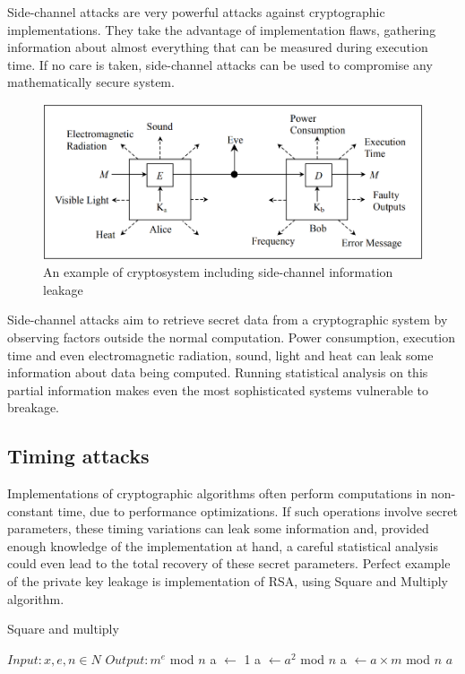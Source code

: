 \documentclass[oneside,openright,12pt,final,en]{mgr}
\begin{document}
Side-channel attacks are very powerful attacks against cryptographic implementations. They take the advantage of implementation flaws, gathering information about almost everything that can be measured during execution time. If no care is taken, side-channel attacks can be used to compromise any mathematically secure system. 
\begin{figure}[H]
	\centering
	\includegraphics{sidechannel}
	\caption{An example of cryptosystem including side-channel information leakage}
	\label{fig:sidechannel}
\end{figure}

Side-channel attacks aim to retrieve secret data from a cryptographic system by observing factors outside the normal computation. Power consumption, execution time and even electromagnetic radiation, sound, light and heat can leak some information about data being computed. Running statistical analysis on this partial information makes even the most sophisticated systems vulnerable to breakage. 


\subsection{Timing attacks}

Implementations of cryptographic algorithms often perform computations in non-constant
time, due to performance optimizations. If such operations involve secret parameters, these timing
variations can leak some information and, provided enough knowledge of the implementation at
hand, a careful statistical analysis could even lead to the total recovery of these secret parameters.\cite{sc} Perfect example of the private key leakage is implementation of RSA, using Square and Multiply algorithm.\cite{sqm}

\begin{algorithm}[H]
	\caption{Square and multiply}\label{sqm}
	\begin{algorithmic}[1]
		
		\State $Input: x,e,n \in N$
		\State $Output: m^e$ mod $n$
		\State a $\gets$ 1
			\State  a $\gets a^2$ mod $n$
				\State a $\gets a 	\times m$ mod $n$
			\EndIf
		\EndFor
		\State
		\Return $a$
	\end{algorithmic}
\end{algorithm}
\end{document}
